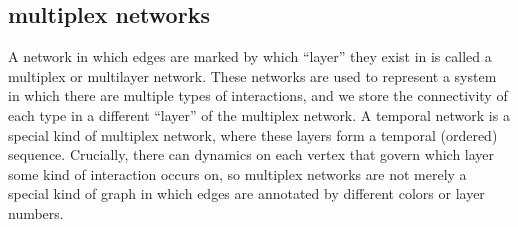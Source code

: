 

\subsection{multiplex networks}

A network in which edges are marked by which “layer” they exist in is called a multiplex or multilayer network. These networks are used to represent a system in which there are multiple types
of interactions, and we store the connectivity of each type in a different “layer” of the multiplex
network. A temporal network is a special kind of multiplex network, where these layers form a
temporal (ordered) sequence. Crucially, there can dynamics on each vertex that govern which layer
some kind of interaction occurs on, so multiplex networks are not merely a special kind of graph
in which edges are annotated by different colors or layer numbers.

